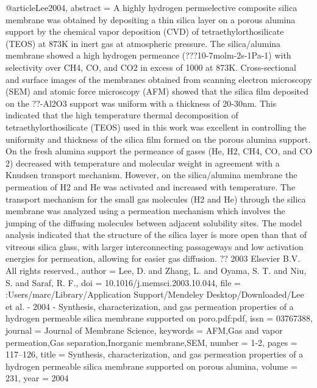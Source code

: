 @article{Lee2004,
abstract = {A highly hydrogen permselective composite silica membrane was obtained by depositing a thin silica layer on a porous alumina support by the chemical vapor deposition (CVD) of tetraethylorthosilicate (TEOS) at 873K in inert gas at atmospheric pressure. The silica/alumina membrane showed a high hydrogen permeance (???10-7molm-2s-1Pa-1) with selectivity over CH4, CO, and CO2 in excess of 1000 at 873K. Cross-sectional and surface images of the membranes obtained from scanning electron microscopy (SEM) and atomic force microscopy (AFM) showed that the silica film deposited on the ??-Al2O3 support was uniform with a thickness of 20-30nm. This indicated that the high temperature thermal decomposition of tetraethylorthosilicate (TEOS) used in this work was excellent in controlling the uniformity and thickness of the silica film formed on the porous alumina support. On the fresh alumina support the permeance of gases (He, H2, CH4, CO, and CO 2) decreased with temperature and molecular weight in agreement with a Knudsen transport mechanism. However, on the silica/alumina membrane the permeation of H2 and He was activated and increased with temperature. The transport mechanism for the small gas molecules (H2 and He) through the silica membrane was analyzed using a permeation mechanism which involves the jumping of the diffusing molecules between adjacent solubility sites. The model analysis indicated that the structure of the silica layer is more open than that of vitreous silica glass, with larger interconnecting passageways and low activation energies for permeation, allowing for easier gas diffusion. ?? 2003 Elsevier B.V. All rights reserved.},
author = {Lee, D. and Zhang, L. and Oyama, S. T. and Niu, S. and Saraf, R. F.},
doi = {10.1016/j.memsci.2003.10.044},
file = {:Users/marc/Library/Application Support/Mendeley Desktop/Downloaded/Lee et al. - 2004 - Synthesis, characterization, and gas permeation properties of a hydrogen permeable silica membrane supported on poro.pdf:pdf},
issn = {03767388},
journal = {Journal of Membrane Science},
keywords = {AFM,Gas and vapor permeation,Gas separation,Inorganic membrane,SEM},
number = {1-2},
pages = {117--126},
title = {{Synthesis, characterization, and gas permeation properties of a hydrogen permeable silica membrane supported on porous alumina}},
volume = {231},
year = {2004}
}
